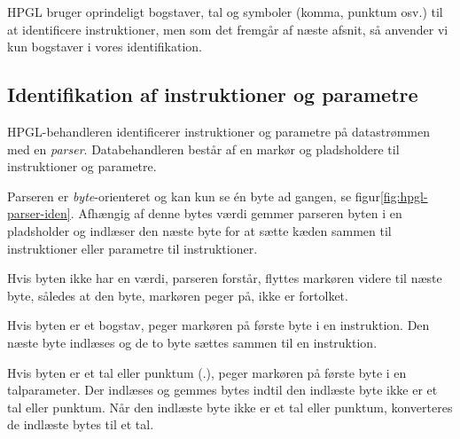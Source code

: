 HPGL bruger oprindeligt bogstaver, tal og symboler (komma, punktum
osv.) til at identificere instruktioner, men som det fremgår af næste
afsnit, så anvender vi kun bogstaver i vores identifikation.

\subsection{Identifikation af instruktioner og parametre}
\label{sc:idn-ins-param}


HPGL-behandleren identificerer instruktioner og parametre på
datastrømmen med en \textit{parser}. Databehandleren består af en
markør og pladsholdere til instruktioner og parametre.

Parseren er \textit{byte}-orienteret og kan kun se én byte ad gangen,
se figur\vref{fig:hpgl-parser-iden}. Afhængig af denne bytes værdi
gemmer parseren byten i en pladsholder og indlæser den næste byte for
at sætte kæden sammen til instruktioner eller parametre til
instruktioner.


Hvis byten ikke har en værdi, parseren forstår, flyttes markøren
videre til næste byte, således at den byte, markøren peger på, ikke er
fortolket.

Hvis byten er et bogstav, peger markøren på første byte i en
instruktion. Den næste byte indlæses og de to byte sættes sammen til
en instruktion.

Hvis byten er et tal eller punktum (.), peger markøren på første byte
i en talparameter. Der indlæses og gemmes bytes indtil den indlæste
byte ikke er et tal eller punktum. Når den indlæste byte ikke er et
tal eller punktum, konverteres de indlæste bytes til et tal.

